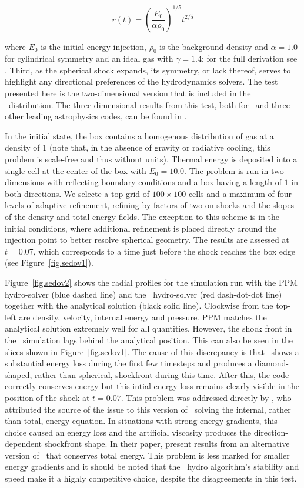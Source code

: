 \begin{equation} r(t) =
\left(\frac{E_0}{\alpha\rho_0}\right)^{1/5}t^{2/5}
\end{equation}

\noindent where $E_0$ is the initial energy injection, $\rho_0$ is the
background density and $\alpha = 1.0$ for cylindrical symmetry and an
ideal gas with $\gamma = 1.4$; for the full derivation see
\citet{Sedov1959}.  Third, as the spherical shock expands, its
symmetry, or lack thereof, serves to highlight any directional
preferences of the hydrodynamics solvers.  The test presented here is
the two-dimensional 
version that is included in the \enzo\ distribution. The
three-dimensional results from this test, both for \enzo\ and three
other leading astrophysics codes, can be found in \citet{Tasker2008}.

In the initial state, the box contains a homogenous distribution of
gas at a density of 1 (note that, in the absence of gravity or
radiative cooling, this
problem is scale-free and thus without units). Thermal energy is
deposited into a single cell at the center of the box with $E_0 =
10.0$. The problem is run in two dimensions with reflecting
boundary conditions and a box having a length of
$1$ in both directions.  We selecte a top grid of $100 \times 100$
cells and a maximum of four levels of adaptive refinement, refining by
factors of two on
shocks and the slopes of the density and total energy fields. The
exception to this scheme is in the initial conditions, where
additional refinement is placed directly around the injection point to
better resolve spherical geometry. The results are assessed
at $t = 0.07$, which corresponds to a time just before the shock
reaches the box edge (see Figure~\ref{fig.sedov1}).

Figure~\ref{fig.sedov2} shows the radial profiles for the simulation
run with the PPM hydro-solver (blue dashed line) and the \zeus\
hydro-solver (red dash-dot-dot line) together with the analytical
solution (black solid line). Clockwise from the top-left are density,
velocity, internal energy and pressure. PPM matches the analytical
solution extremely well for all quantities. However, the shock front
in the \zeus\ simulation lags behind the analytical position. This can
also be seen in the slices shown in Figure~\ref{fig.sedov1}. The cause
of this discrepancy is that \zeus\ shows a substantial energy loss
during the first few timesteps and produces a diamond-shaped, rather
than spherical, shockfront during this time. After this, the code
correctly conserves energy but this intial energy loss remains clearly
visible in the position of the shock at $t = 0.07$. This problem was
addressed directly by \citet{Clarke2010}, who attributed the source of
the issue to this version of \zeus\ solving the internal, rather than
total, energy equation. In situations with strong energy gradients,
this choice caused an energy loss and the artificial viscosity
produces the direction-dependent shockfront shape. In their paper,
\citet{Clarke2010} present results from an alternative version of
\zeus\ that conserves total energy. This problem is less marked for
smaller energy gradients and it should be noted that the \zeus\ hydro
algorithm's stability and speed make it a highly competitive choice,
despite the disagreements in this test.
